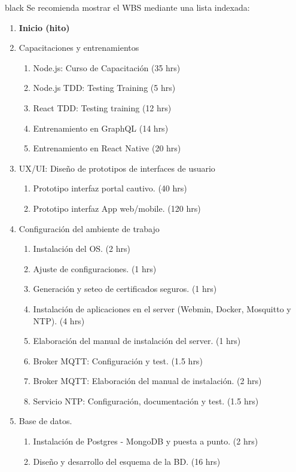 \documentclass[11pt]{charter}
\begin{document}
\begin{consigna}{black}
Se recomienda mostrar el WBS mediante una lista indexada:

\begin{enumerate}
\item \textbf{Inicio (hito)}
\item Capacitaciones y entrenamientos
	\begin{enumerate}
		\item Node.js: Curso de Capacitación (35 hrs)
		\item Node.js TDD: Testing Training (5 hrs)
		\item React TDD: Testing training (12 hrs)
		\item Entrenamiento en GraphQL (14 hrs)
		\item Entrenamiento en React Native (20 hrs)
	\end{enumerate}
\item UX/UI: Diseño de prototipos de interfaces de usuario
	\begin{enumerate}
		\item Prototipo interfaz portal cautivo. (40 hrs)
		\item Prototipo interfaz App web/mobile. (120 hrs)
	\end{enumerate}
\item Configuración del ambiente de trabajo
	\begin{enumerate}
		\item Instalación del OS. (2 hrs)
		\item Ajuste de configuraciones. (1 hrs)
		\item Generación y seteo de certificados seguros. (1 hrs)
		\item Instalación de aplicaciones en el server (Webmin, Docker, Mosquitto y NTP). (4 hrs)
		\item Elaboración del manual de instalación del server. (1 hrs)
		\item Broker MQTT: Configuración y test. (1.5 hrs)
		\item Broker MQTT: Elaboración del manual de instalación. (2 hrs)
		\item Servicio NTP: Configuración, documentación y test. (1.5 hrs)
	\end{enumerate}
\item Base de datos.
	\begin{enumerate}
		\item Instalación de Postgres - MongoDB y puesta a punto. (2 hrs)
		\item Diseño y desarrollo del esquema de la BD. (16 hrs)

\end{enumerate}
\end{enumerate}
\end{consigna}
\end{document}
